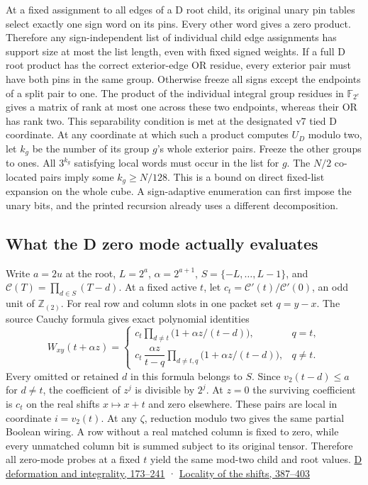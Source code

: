 \documentclass[
  11pt,
]{article}
\begin{document}
At a fixed assignment to all edges of a D root child, its original unary
pin tables select exactly one sign word on its pins. Every other word
gives a zero product. Therefore any sign-independent list of individual
child edge assignments has support size at most the list length, even
with fixed signed weights. If a full D root product has the correct
exterior-edge OR residue, every exterior pair must have both pins in the
same group. Otherwise freeze all signs except the endpoints of a split
pair to one. The product of the individual integral group residues in
\(\mathbb F_{2^e}\) gives a matrix of rank at most one across these two
endpoints, whereas their OR has rank two. This separability condition is
met at the designated v7 tied D coordinate. At any coordinate at which
such a product computes \(U_D\) modulo two, let \(k_g\) be the number of
its group \(g\)'s whole exterior pairs. Freeze the other groups to ones.
All \(3^{k_g}\) satisfying local words must occur in the list for \(g\).
The \(N/2\) co-located pairs imply some \(k_g\ge N/128\). This is a
bound on direct fixed-list expansion on the whole cube. A sign-adaptive
enumeration can first impose the unary bits, and the printed recursion
already uses a different decomposition.

\subsection{What the D zero mode actually
evaluates}\label{v8-what-the-d-zero-mode-actually-evaluates}

Write \(a=2u\) at the root, \(L=2^a\), \(\alpha=2^{a+1}\),
\(S=\{-L,\ldots,L-1\}\), and \(\mathcal C(T)=\prod_{d\in S}(T-d)\). At a
fixed active \(t\), let \(c_t=\mathcal C'(t)/\mathcal C'(0)\), an odd
unit of \(\mathbb Z_{(2)}\). For real row and column slots in one packet
set \(q=y-x\). The source Cauchy formula gives exact polynomial
identities \[
 W_{xy}(t+\alpha z)=
 \begin{cases}
 c_t\displaystyle\prod_{d\ne t}\bigl(1+\alpha z/(t-d)\bigr),&q=t,\\[3pt]
 c_t\,\dfrac{\alpha z}{t-q}
    \displaystyle\prod_{d\ne t,q}\bigl(1+\alpha z/(t-d)\bigr),&q\ne t .
 \end{cases}
\tag{N7}
\] Every omitted or retained \(d\) in this formula belongs to \(S\).
Since \(v_2(t-d)\le a\) for \(d\ne t\), the coefficient of \(z^j\) is
divisible by \(2^j\). At \(z=0\) the surviving coefficient is \(c_t\) on
the real shifts \(x\mapsto x+t\) and zero elsewhere. These pairs are
local in coordinate \(i=v_2(t)\). At any \(\zeta\), reduction modulo two
gives the same partial Boolean wiring. A row without a real matched
column is fixed to zero, while every unmatched column bit is summed
subject to its original tensor. Therefore all zero-mode probes at a
fixed \(t\) yield the same mod-two child and root values.
\href{https://github.com/openai/math/blob/main/preprints/The-Exponential-Time-Hypothesis-is-False-October-25-2026/build/quantitative-contraction.tex\#L173}{D
deformation and integrality, 173--241} ·
\href{https://github.com/openai/math/blob/main/preprints/The-Exponential-Time-Hypothesis-is-False-October-25-2026/build/quantitative-contraction.tex\#L387}{Locality
of the shifts, 387--403}
\end{document}
